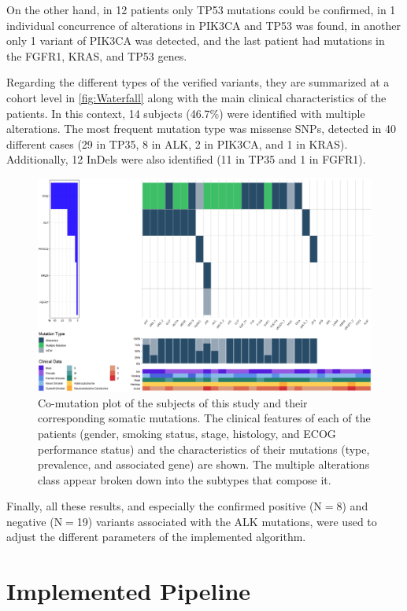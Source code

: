 On the other hand, in 12 patients only TP53 mutations could be confirmed, in 1 individual concurrence of alterations in PIK3CA and TP53 was found, in another only 1 variant of PIK3CA was detected, and the last patient had mutations in the FGFR1, KRAS, and TP53 genes.

Regarding the different types of the verified variants, they are summarized at a cohort level in \autoref{fig:Waterfall} along with the main clinical characteristics of the patients. In this context, 14 subjects (46.7\%) were identified with multiple alterations. The most frequent mutation type was missense SNPs, detected in 40 different cases (29 in TP35, 8 in ALK, 2 in PIK3CA, and 1 in KRAS). Additionally, 12 InDels were also identified (11 in TP35 and 1 in FGFR1).

\begin{figure}[ht]
    \centering
    \includegraphics[width=\textwidth]{Images/chapter_4/waterfall.png}
    \caption{Co-mutation plot of the subjects of this study and their corresponding somatic mutations. The clinical features of each of the patients (gender, smoking status, stage, histology, and ECOG performance status) and the characteristics of their mutations (type, prevalence, and associated gene) are shown. The multiple alterations class appear broken down into the subtypes that compose it.}
    \label{fig:Waterfall}
\end{figure}

Finally, all these results, and especially the confirmed positive (N$=$8) and negative (N$=$19) variants associated with the ALK mutations, were used to adjust the different parameters of the implemented algorithm.

\section{Implemented Pipeline}

